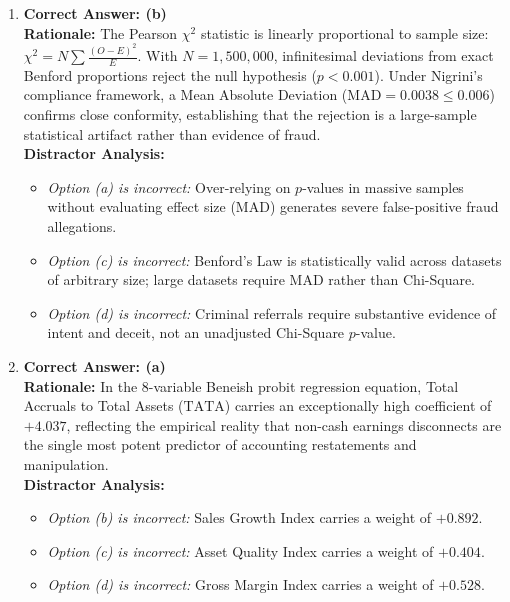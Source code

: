 \begin{enumerate}[label=\textbf{MCQ 5.\arabic*}]
    \item \textbf{Correct Answer: (b)}\\
    \textbf{Rationale:} The Pearson $\chi^2$ statistic is linearly proportional to sample size: $\chi^2 = N \sum \frac{(O-E)^2}{E}$. With $N = 1{,}500{,}000$, infinitesimal deviations from exact Benford proportions reject the null hypothesis ($p < 0.001$). Under Nigrini's compliance framework, a Mean Absolute Deviation ($\text{MAD} = 0.0038 \le 0.006$) confirms close conformity, establishing that the rejection is a large-sample statistical artifact rather than evidence of fraud.\\
    \textbf{Distractor Analysis:}
    \begin{itemize}
        \item \textit{Option (a) is incorrect:} Over-relying on $p$-values in massive samples without evaluating effect size (MAD) generates severe false-positive fraud allegations.
        \item \textit{Option (c) is incorrect:} Benford's Law is statistically valid across datasets of arbitrary size; large datasets require MAD rather than Chi-Square.
        \item \textit{Option (d) is incorrect:} Criminal referrals require substantive evidence of intent and deceit, not an unadjusted Chi-Square $p$-value.
    \end{itemize}

    \item \textbf{Correct Answer: (a)}\\
    \textbf{Rationale:} In the 8-variable Beneish probit regression equation, Total Accruals to Total Assets ($\text{TATA}$) carries an exceptionally high coefficient of $+4.037$, reflecting the empirical reality that non-cash earnings disconnects are the single most potent predictor of accounting restatements and manipulation.\\
    \textbf{Distractor Analysis:}
    \begin{itemize}
        \item \textit{Option (b) is incorrect:} Sales Growth Index carries a weight of $+0.892$.
        \item \textit{Option (c) is incorrect:} Asset Quality Index carries a weight of $+0.404$.
        \item \textit{Option (d) is incorrect:} Gross Margin Index carries a weight of $+0.528$.
    \end{itemize}
\end{enumerate}

